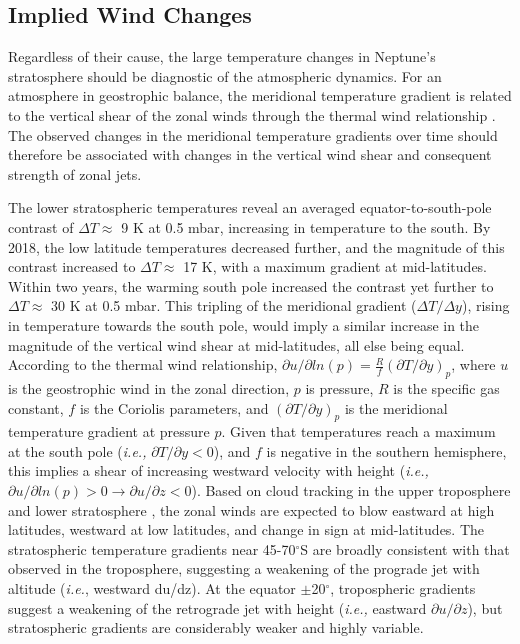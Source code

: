 \documentclass[twocolumn,10pt]{aastex631}
\begin{document}
\subsection{Implied Wind Changes}
Regardless of their cause, the large temperature changes in Neptune's stratosphere should be diagnostic of the atmospheric dynamics.  For an atmosphere in geostrophic balance, the meridional temperature gradient is related to the vertical shear of the zonal winds through the thermal wind relationship \citep[\textit{e.g.},][]{forsythe1945thermalwind,holton1973introduction,conrath1983thermal}. The observed changes in the meridional temperature gradients over time should therefore be associated with changes in the vertical wind shear and consequent strength of zonal jets. 

The lower stratospheric temperatures reveal an averaged equator-to-south-pole contrast of $\Delta T\approx $ 9 K at 0.5 mbar, increasing in temperature to the south. By 2018, the low latitude temperatures decreased further, and the magnitude of this contrast increased to $\Delta T\approx$ 17 K, with a maximum gradient at mid-latitudes. Within two years, the warming south pole increased the contrast yet further to $\Delta T\approx$ 30 K at 0.5 mbar.  This tripling of the meridional gradient ($\Delta T/\Delta y$), rising in temperature towards the south pole, would imply a similar increase in the magnitude of the vertical wind shear at mid-latitudes, all else being equal. According to the thermal wind relationship, \(\partial u/\partial ln(p) = \frac{R}{f} (\partial T/\partial y)_p\), where $u$ is the geostrophic wind in the zonal direction, $p$ is pressure, $R$ is the specific gas constant, $f$ is the Coriolis parameters,  and $(\partial T/\partial y)_p$ is the meridional temperature gradient at pressure $p$.  Given that temperatures reach a maximum at the south pole (\textit{i.e.,} \(\partial T/\partial y <0\)), and $f$ is negative in the southern hemisphere, this implies a shear of increasing westward velocity with height (\textit{i.e.,} \(\partial u/\partial ln(p)>0\rightarrow\partial u/\partial z<0\)).  Based on cloud tracking in the upper troposphere and lower stratosphere \citep[\textit{e.g.},][]{limaye1991winds,sromovsky2001coordinated,sromovsky2001neptune, tollefson2018thermalwind}, the zonal winds are expected to blow eastward at high latitudes, westward at low latitudes, and change in sign at mid-latitudes.  The stratospheric temperature gradients near 45-70$^{\circ}$S are broadly consistent with that observed in the troposphere, suggesting a weakening of the prograde jet with altitude (\textit{i.e.}, westward du/dz).  At the equator $\pm$20$^{\circ}$, tropospheric gradients suggest a weakening of the retrograde jet with height (\textit{i.e.,} eastward \(\partial u/\partial z\)), but stratospheric gradients are considerably weaker and highly variable.
\end{document}

